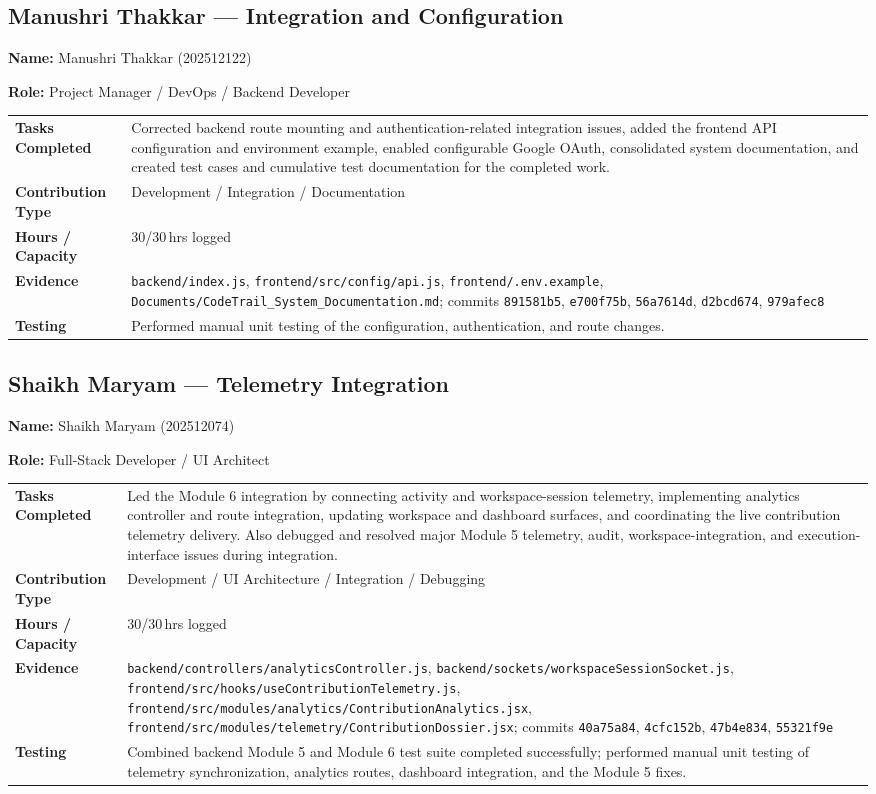 \documentclass[11pt,a4paper]{article}
\newcommand{\field}[2]{\textbf{#1:} #2\par}
\begin{document}
\subsection{Manushri Thakkar --- Integration and Configuration}
\field{Name}{Manushri Thakkar (202512122)}
\field{Role}{Project Manager / DevOps / Backend Developer}
{\small
\begin{tabularx}{\textwidth}{>{\bfseries}p{}Y}
\toprule
Tasks Completed & Corrected backend route mounting and authentication-related integration issues, added the frontend API configuration and environment example, enabled configurable Google OAuth, consolidated system documentation, and created test cases and cumulative test documentation for the completed work. \\
Contribution Type & Development / Integration / Documentation \\
Hours / Capacity & 30/30\,hrs logged \\
Evidence & \texttt{backend/index.js}, \texttt{frontend/src/config/api.js}, \texttt{frontend/.env.example}, \texttt{Documents/CodeTrail\_System\_Documentation.md}; commits \texttt{891581b5}, \texttt{e700f75b}, \texttt{56a7614d}, \texttt{d2bcd674}, \texttt{979afec8} \\
Testing & Performed manual unit testing of the configuration, authentication, and route changes. \\
\bottomrule
\end{tabularx}
}

\subsection{Shaikh Maryam --- Telemetry Integration}
\field{Name}{Shaikh Maryam (202512074)}
\field{Role}{Full-Stack Developer / UI Architect}
{\small
\begin{tabularx}{\textwidth}{>{\bfseries}p{}Y}
\toprule
Tasks Completed & Led the Module 6 integration by connecting activity and workspace-session telemetry, implementing analytics controller and route integration, updating workspace and dashboard surfaces, and coordinating the live contribution telemetry delivery. Also debugged and resolved major Module 5 telemetry, audit, workspace-integration, and execution-interface issues during integration. \\
Contribution Type & Development / UI Architecture / Integration / Debugging \\
Hours / Capacity & 30/30\,hrs logged \\
Evidence & \texttt{backend/controllers/analyticsController.js}, \texttt{backend/sockets/workspaceSessionSocket.js}, \texttt{frontend/src/hooks/useContributionTelemetry.js}, \texttt{frontend/src/modules/analytics/ContributionAnalytics.jsx}, \texttt{frontend/src/modules/telemetry/ContributionDossier.jsx}; commits \texttt{40a75a84}, \texttt{4cfc152b}, \texttt{47b4e834}, \texttt{55321f9e} \\
Testing & Combined backend Module 5 and Module 6 test suite completed successfully; performed manual unit testing of telemetry synchronization, analytics routes, dashboard integration, and the Module 5 fixes. \\
\bottomrule
\end{tabularx}
}
\end{document}
